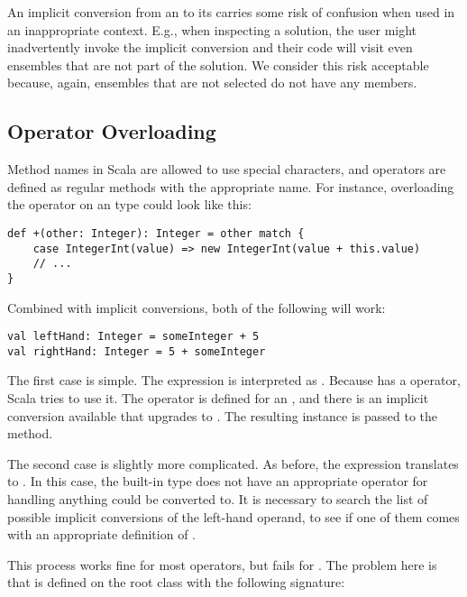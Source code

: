 An implicit conversion from an  to its  carries some
risk of confusion when used in an inappropriate context. E.g., when inspecting a
solution, the user might inadvertently invoke the implicit conversion and their code
will visit even ensembles that are not part of the solution. We consider this risk
acceptable because, again, ensembles that are not selected do not have any members.


\subsection{Operator Overloading}
\label{impl:scala:operators}

Method names in Scala are allowed to use special characters, and operators are defined
as regular methods with the appropriate name. For instance, overloading the \dop{+}
operator on an  type could look like this:
\begin{lstlisting}[style=snippet]
def +(other: Integer): Integer = other match {
    case IntegerInt(value) => new IntegerInt(value + this.value)
    // ...
}
\end{lstlisting}
\noindent
Combined with implicit conversions, both of the following will work:

\begin{lstlisting}[style=snippet]
val leftHand: Integer = someInteger + 5
val rightHand: Integer = 5 + someInteger
\end{lstlisting}
\noindent
The first case is simple. The expression  is interpreted as
. Because  has a \dop{+} operator, Scala tries to
use it. The operator is defined for an , and there is an implicit conversion
available that upgrades  to . The resulting instance is passed to the
\dop{+} method.

The second case is slightly more complicated. As before, the expression translates to
. In this case, the built-in  type does not have an
appropriate \dop{+} operator for handling anything  could be converted
to. It is necessary to search the list of possible implicit conversions of the left-hand
operand, to see if one of them comes with an appropriate definition of \dop{+}.

\medskip

This process works fine for most operators, but fails for \dop{==}. The problem here is
that \dop{==} is defined on the root class  with the following signature:

